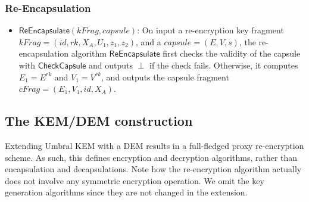 \documentclass{amsart}
\begin{document}
\subsubsection{Re-Encapsulation}%

\begin{itemize}
\item $\mathsf{ReEncapsulate}(kFrag, capsule)$: On input a re-encryption key fragment $kFrag= (id, rk, X_A, U_1, z_1, z_2)$, and a $capsule = (E,V,s)$, the re-encapsulation algorithm $\mathsf{ReEncapsulate}$ first checks the validity of the capsule with $\mathsf{CheckCapsule}$ and outputs $\perp$ if the check fails. Otherwise, it computes $E_1 = E^{rk}$ and $V_1 = V^{rk}$, and outputs the capsule fragment $cFrag = (E_1, V_1, id, X_A)$. 




\end{itemize}

		

\subsection{The KEM/DEM construction}

Extending Umbral KEM with a DEM results in a full-fledged proxy re-encryption scheme. As such, this defines encryption and decryption algorithms, rather than encapsulation and decapsulations. Note how the re-encryption algorithm actually does not involve any symmetric encryption operation. We omit the key generation algorithms since they are not changed in the extension. 
\end{document}
